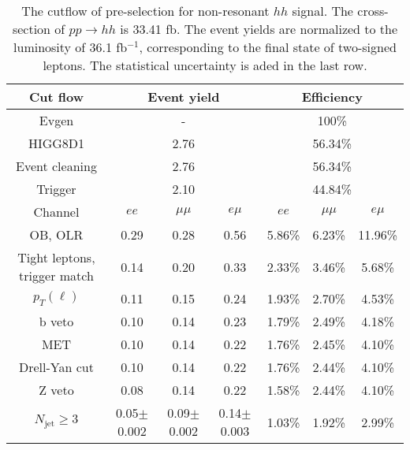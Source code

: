 \begin{table}
\centering\small
\begin{tabular}{c|ccc|ccc}
\hline
\hline
Cut flow &\multicolumn{3}{c|}{Event yield}&\multicolumn{3}{c}{Efficiency}      \\
\hline
Evgen&\multicolumn{3}{c|}{-}&\multicolumn{3}{c}{100\%}\\
HIGG8D1&\multicolumn{3}{c|}{2.76}&\multicolumn{3}{c}{56.34\%}\\
Event cleaning&\multicolumn{3}{c|}{2.76}&\multicolumn{3}{c}{56.34\%}\\
Trigger&\multicolumn{3}{c|}{2.10    }&\multicolumn{3}{c}{44.84\%}\\
Channel&$ee$&$\mu\mu$&$e\mu$&$ee$&$\mu\mu$&$e\mu$\\
\hline
OB, OLR    &0.29    &0.28    &0.56& 5.86\%    &6.23\%    &11.96\%\\
Tight leptons, trigger match    &0.14    &0.20    &0.33    &2.33\%    &3.46\%    &5.68\%\\
$p_T(\ell)$    &0.11    &0.15    &0.24    &1.93\%    &2.70\%    &4.53\%\\
b veto    &0.10    &0.14    &0.23    &1.79\%    &2.49\%    &4.18\%\\
MET    &0.10    &0.14    &0.22    &1.76\%    &2.45\%    &4.10\%\\
Drell-Yan cut    &0.10    &0.14    &0.22    &1.76\%    &2.44\%    &4.10\%\\
Z veto    &0.08    &0.14    &0.22    &1.58\%    &2.44\%    &4.10\%\\
$N_{\text{jet}}\geq3$    &0.05$\pm$0.002    &0.09$\pm$0.002    &0.14$\pm$0.003    &1.03\%    &1.92\%    &2.99\%\\
\hline
\hline
\end{tabular}
\caption{The cutflow of pre-selection for non-resonant $hh$ signal. The cross-section of $pp \rightarrow hh$ is 33.41 fb. The event yields are normalized to the luminosity of 36.1 fb$^{-1}$, corresponding to the final state of two-signed leptons. The statistical uncertainty is aded in the last row.}
\label{tab:presel_cutflow_smhh}
\end{table}
